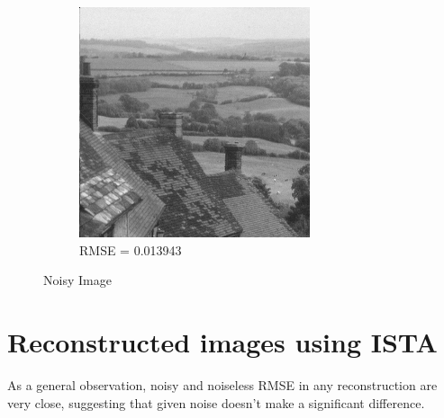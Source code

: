 \documentclass[a4paper]{article}
\begin{document}
\begin{figure}[H]
\begin{subfigure}{0.24\linewidth}
        \includegraphics[width = \linewidth]{goldhill with noise.png}
        \caption{RMSE = 0.013943}
    \end{subfigure}
    \caption{Noisy Image}
    \label{fig:n}
\end{figure}
\section{Reconstructed images using ISTA}
As a general observation, noisy and noiseless RMSE in any reconstruction are very close, suggesting that given noise doesn't make a significant difference.
\end{document}
